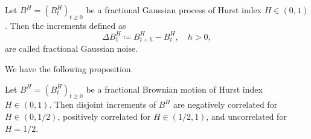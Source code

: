 \begin{defn}
    Let $B^{H}= (B_{t}^{H})_{t\geq 0}$ be a fractional Gaussian process of Hurst index $H\in (0,1)$. Then the increments defined as
    \begin{equation}
        \Delta B_{t}^{H}\coloneqq B_{t+h}^{H}-B_{t}^{H}, \quad h>0,
    \end{equation}
    are called fractional Gaussian noise.
\end{defn}
We have the following proposition.
\begin{prop}\label{corr}
    Let $B^{H}=(B_{t}^{H})_{t\geq 0}$ be a fractional Brownian motion of Hurst index $H\in (0,1)$. Then disjoint increments of $B^H$ are negatively correlated for $H\in (0,1/2)$, positively correlated for $H\in (1/2,1)$, and uncorrelated for $H=1/2$.
\end{prop}
